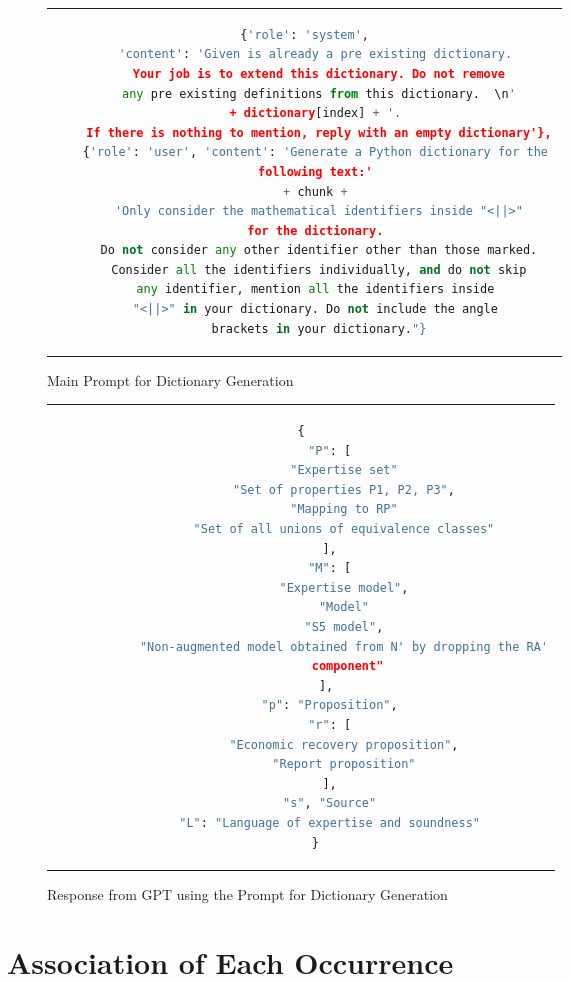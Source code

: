 \begin{figure}[htpb]
  \centering
  \begin{tabular}{c}
  \begin{lstlisting}[language=python]
    {'role': 'system',
    'content': 'Given is already a pre existing dictionary. 
    Your job is to extend this dictionary. Do not remove
    any pre existing definitions from this dictionary.  \n'
    + dictionary[index] + '. 
    If there is nothing to mention, reply with an empty dictionary'},
    {'role': 'user', 'content': 'Generate a Python dictionary for the 
    following text:' 
    + chunk + 
    'Only consider the mathematical identifiers inside "<||>"
    for the dictionary. 
    Do not consider any other identifier other than those marked.
    Consider all the identifiers individually, and do not skip
    any identifier, mention all the identifiers inside 
    "<||>" in your dictionary. Do not include the angle 
    brackets in your dictionary."}
  \end{lstlisting}
  \end{tabular}
  \caption[Main Prompt for Dictionary Generation]{Main Prompt for Dictionary Generation} \label{fig:prompt_dic}
\end{figure}

\begin{figure}[htpb]
  \centering
  \begin{tabular}{c}
  \begin{lstlisting}[language=python]
    {
        "P": [
            "Expertise set"
            "Set of properties P1, P2, P3",
            "Mapping to RP"
            "Set of all unions of equivalence classes"
        ],
        "M": [
            "Expertise model",
            "Model"
            "S5 model",
            "Non-augmented model obtained from N' by dropping the RA'
             component"
        ], 
        "p": "Proposition",
        "r": [
            "Economic recovery proposition",
            "Report proposition"
        ],
        "s", "Source"
        "L": "Language of expertise and soundness"
    }
  \end{lstlisting}
  \end{tabular}
  \caption[Response from Main Prompt for Dictionary Generation]{Response from GPT using the Prompt for Dictionary Generation}\label{fig:dic_response}
\end{figure}

\section{Association of Each Occurrence}\label{sec:annotation}

